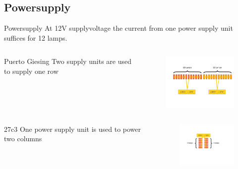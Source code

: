 \documentclass{beamer}
\begin{document}
\subsection{Powersupply}
  \begin{frame}{Powersupply}
  At 12V supplyvoltage the current from one power supply unit suffices for 12 lamps.
  \begin{columns}
    \begin{column}{4cm}
     \begin{block}{ Puerto Giesing}
     Two supply units are used to supply one row
     \end{block}
    \end{column}
    \begin{column}{7cm}
    \begin{figure}
    \includegraphics[width=6cm, clip, trim= 2.5cm 4.6cm 0.5cm 4cm]{bilder/12lampen.pdf}
    \end{figure}
    \end{column}
  \end{columns}
  \begin{columns}[T]
    \begin{column}{4cm}
    \vskip 0.4cm
    \begin{block}{27c3}
     One power supply unit is used to power two columns
    \end{block}
    \end{column}
    \begin{column}{7cm}
    \begin{figure}
    \includegraphics[width=4cm, clip, trim= 4cm 5cm 7cm 4cm]{bilder/6lampen.pdf}
    \end{figure}
    \end{column}
  \end{columns}
  \end{frame}
\end{document}
